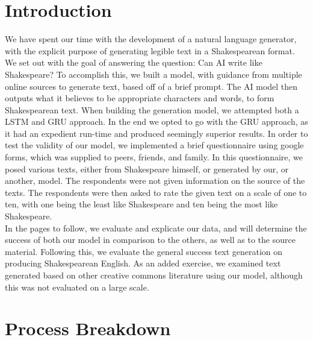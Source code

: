 \documentclass[11pt,a4paper]{article}
\begin{document}
\section{Introduction}
\label{sec:intro}
We have spent our time with the development of a natural language generator, with the explicit purpose of generating legible text in a Shakespearean format. We set out with the goal of answering the question: Can AI write like Shakespeare? To accomplish this, we built a model, with guidance from multiple online sources to generate text, based off of a brief prompt. The AI model then outputs what it believes to be appropriate characters and words, to form Shakespearean text. When building the generation model, we attempted both a LSTM and GRU approach. In the end we opted to go with the GRU approach, as it had an expedient run-time and produced seemingly superior results. In order to test the validity of our model, we implemented a brief questionnaire using google forms, which was supplied to peers, friends, and family. In this questionnaire, we posed various texts, either from Shakespeare himself, or generated by our, or another, model. The respondents were not given information on the source of the texts. The respondents were then asked to rate the given text on a scale of one to ten, with one being the least like Shakespeare and ten being the most like Shakespeare.\\
In the pages to follow, we evaluate and explicate our data, and will determine the success of both our model in comparison to the others, as well as to the source material. Following this, we evaluate the general success text generation on producing Shakespearean English. As an added exercise, we examined text generated based on other creative commons literature using our model, although this was not evaluated on a large scale.

\section{Process Breakdown}
\label{sec:process}
\end{document}
